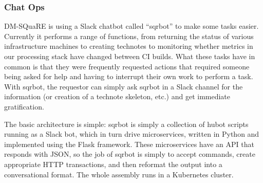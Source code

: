 \subsubsection{Chat Ops}

DM-SQuaRE is using a Slack chatbot called ``sqrbot'' to make some tasks
easier. Currently it performs a range of functions, from returning the
status of various infrastructure machines to creating technotes to
monitoring whether metrics in our processing stack have changed between
CI builds. What these tasks have in common is that they were frequently
requested actions that required someone being asked for help and having
to interrupt their own work to perform a task. With sqrbot, the
requestor can simply ask sqrbot in a Slack channel for the information
(or creation of a technote skeleton, etc.) and get immediate gratification.

The basic architecture is simple: sqrbot is simply a collection of hubot
scripts running as a Slack bot, which in turn drive microservices,
written in Python and implemented using the Flask framework.  These
microservices have an API that responds with JSON, so the job of sqrbot
is simply to accept commands, create appropriate HTTP transactions, and
then reformat the output into a conversational format.  The whole
assembly runs in a Kubernetes cluster.
